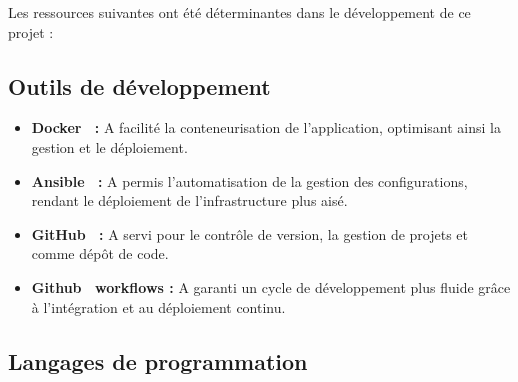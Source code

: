 Les ressources suivantes ont été déterminantes dans le développement de ce projet :

\subsection{Outils de développement}\label{subsec:outils-de-developpement}
\begin{itemize}
    \item \textbf{Docker~\cite{dockerDoc:online} :} A facilité la conteneurisation de l'application, optimisant ainsi la gestion et le déploiement.
    \item \textbf{Ansible~\cite{ansibleDoc:online} :} A permis l'automatisation de la gestion des configurations, rendant le déploiement de l'infrastructure plus aisé.
    \item \textbf{GitHub~\cite{craftbra55:online} :} A servi pour le contrôle de version, la gestion de projets et comme dépôt de code.
    \item \textbf{Github~\cite{Usingwor49:online} workflows :} A garanti un cycle de développement plus fluide grâce à l'intégration et au déploiement continu.
\end{itemize}

\subsection{Langages de programmation}\label{subsec:langages-de-programmation}

